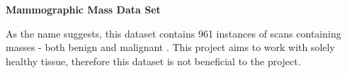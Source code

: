 \noindent \textbf{Mammographic Mass Data Set}

As the name suggests, this dataset contains 961 instances of scans containing masses - both benign and malignant \cite{Elter_Schulz-Wendtland_Wittenberg_2007}. This project aims to work with solely healthy tissue, therefore this dataset is not beneficial to the project.
